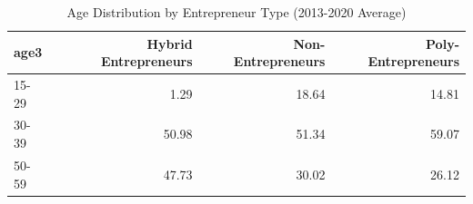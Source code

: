 \begin{table}[ht]
\centering
\caption{Age Distribution by Entrepreneur Type (2013-2020 Average)} 
\label{tab:characteristics_age_avg}
\begin{tabular}{lrrr}
  \toprule
age3 & Hybrid Entrepreneurs & Non-Entrepreneurs & Poly-Entrepreneurs \\ 
  \midrule
15-29 & 1.29 & 18.64 & 14.81 \\ 
  30-39 & 50.98 & 51.34 & 59.07 \\ 
  50-59 & 47.73 & 30.02 & 26.12 \\ 
   \bottomrule
\end{tabular}
\end{table}

